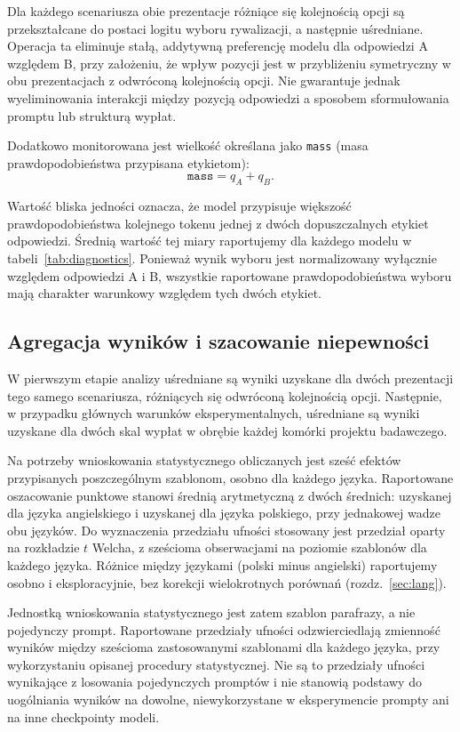 \documentclass[11pt]{article}
\begin{document}
Dla każdego scenariusza obie prezentacje różniące się kolejnością opcji są przekształcane do postaci logitu wyboru rywalizacji, a następnie uśredniane. Operacja ta eliminuje stałą, addytywną preferencję modelu dla odpowiedzi A względem B, przy założeniu, że wpływ pozycji jest w przybliżeniu symetryczny w obu prezentacjach z odwróconą kolejnością opcji. Nie gwarantuje jednak wyeliminowania interakcji między pozycją odpowiedzi a sposobem sformułowania promptu lub strukturą wypłat.

Dodatkowo monitorowana jest wielkość określana jako \texttt{mass} (masa prawdopodobieństwa przypisana etykietom):
\begin{equation}
    \texttt{mass}=q_A+q_B.
\end{equation}

Wartość bliska jedności oznacza, że model przypisuje większość prawdopodobieństwa kolejnego tokenu jednej z dwóch dopuszczalnych etykiet odpowiedzi. Średnią wartość tej miary raportujemy dla każdego modelu w tabeli~\ref{tab:diagnostics}. Ponieważ wynik wyboru jest normalizowany wyłącznie względem odpowiedzi A i B, wszystkie raportowane prawdopodobieństwa wyboru mają charakter warunkowy względem tych dwóch etykiet.

\subsection{Agregacja wyników i szacowanie niepewności}\label{sec:stats}
W pierwszym etapie analizy uśredniane są wyniki uzyskane dla dwóch prezentacji tego samego scenariusza, różniących się odwróconą kolejnością opcji. Następnie, w przypadku głównych warunków eksperymentalnych, uśredniane są wyniki uzyskane dla dwóch skal wypłat w obrębie każdej komórki projektu badawczego.

Na potrzeby wnioskowania statystycznego obliczanych jest sześć efektów przypisanych poszczególnym szablonom, osobno dla każdego języka. Raportowane oszacowanie punktowe stanowi średnią arytmetyczną z dwóch średnich: uzyskanej dla języka angielskiego i uzyskanej dla języka polskiego, przy jednakowej wadze obu języków. Do wyznaczenia przedziału ufności stosowany jest przedział oparty na rozkładzie $t$ Welcha, z sześcioma obserwacjami na poziomie szablonów dla każdego języka.  Różnice między językami (polski minus angielski) raportujemy osobno i eksploracyjnie, bez korekcji wielokrotnych porównań (rozdz.~\ref{sec:lang}).

Jednostką wnioskowania statystycznego jest zatem szablon parafrazy, a nie pojedynczy prompt. Raportowane przedziały ufności odzwierciedlają zmienność wyników między sześcioma zastosowanymi szablonami dla każdego języka, przy wykorzystaniu opisanej procedury statystycznej. Nie są to przedziały ufności wynikające z losowania pojedynczych promptów i nie stanowią podstawy do uogólniania wyników na dowolne, niewykorzystane w eksperymencie prompty ani na inne checkpointy modeli.
\end{document}
